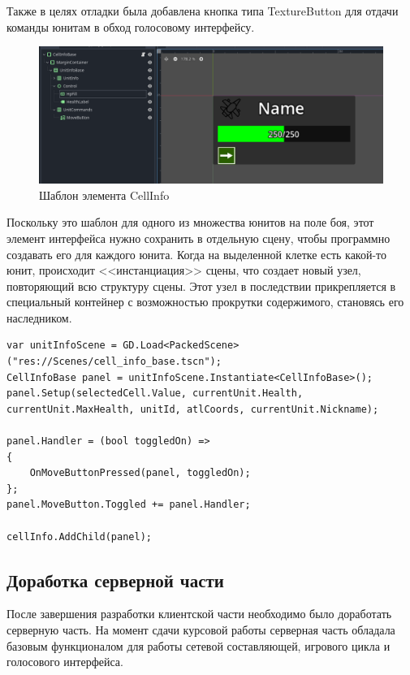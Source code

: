             Также в целях отладки была добавлена кнопка типа TextureButton для отдачи команды юнитам в обход голосовому интерфейсу.
            

            \begin{figure}[H]
                \centering
                \includegraphics[width=\textwidth]{pictures/cellinfobase.png}
                \caption{Шаблон элемента CellInfo}\label{ris2.5}
            \end{figure}

            Поскольку это шаблон для одного из множества юнитов на поле боя, этот элемент интерфейса нужно сохранить в отдельную сцену, чтобы программно создавать его для каждого юнита. Когда на выделенной клетке есть какой-то юнит, происходит <<инстанциация>> сцены, что создает новый узел, повторяющий всю структуру сцены. Этот узел в последствии прикрепляется в специальный контейнер с возможностью прокрутки содержимого, становясь его наследником.
            \begin{lstlisting}[caption=Создание экземпляра шаблона]
var unitInfoScene = GD.Load<PackedScene>("res://Scenes/cell_info_base.tscn");
CellInfoBase panel = unitInfoScene.Instantiate<CellInfoBase>();
panel.Setup(selectedCell.Value, currentUnit.Health, currentUnit.MaxHealth, unitId, atlCoords, currentUnit.Nickname);

panel.Handler = (bool toggledOn) =>
{
    OnMoveButtonPressed(panel, toggledOn);
};
panel.MoveButton.Toggled += panel.Handler;

cellInfo.AddChild(panel);
            \end{lstlisting}


    \subsection{Доработка серверной части}

        После завершения разработки клиентской части необходимо было доработать серверную часть. На момент сдачи курсовой работы серверная часть обладала базовым функционалом для работы сетевой составляющей, игрового цикла и голосового интерфейса.


